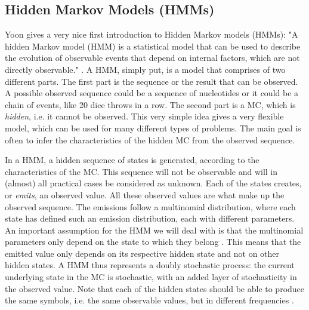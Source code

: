 \documentclass{article}\usepackage[]{graphicx}\usepackage[]{color}
\begin{document}
\subsection{Hidden Markov Models (HMMs)} \label{Section:HiddenMarkovModels}
Yoon gives a very nice first introduction to Hidden Markov models (HMMs): "A hidden Markov model (HMM) is a statistical model that can be used to describe the evolution of observable events that depend on internal factors, which are not directly observable." \cite{Yoon2009}. A HMM, simply put, is a model that comprises of two different parts. The first part is the sequence or the result that can be observed. A possible observed sequence could be a sequence of nucleotides or it could be a chain of events, like 20 dice throws in a row. The second part is a MC, which is \textit{hidden}, i.e. it cannot be observed. This very simple idea gives a very flexible model, which can be used for many different types of problems. The main goal is often to infer the characteristics of the hidden MC from the observed sequence. 

In a HMM, a hidden sequence of states is generated, according to the characteristics of the MC. This sequence will not be observable and will in (almost) all practical cases be considered as unknown. Each of the states creates, or \textit{emits}, an observed value. All these observed values are what make up the observed sequence. The emissions follow a multinomial distribution, where each state has defined such an emission distribution, each with different parameters. An important assumption for the HMM we will deal with is that the multinomial parameters only depend on the state to which they belong \cite{Choo2004}. This means that the emitted value only depends on its respective hidden state and not on other hidden states. A HMM thus represents a doubly stochastic process: the current underlying state in the MC is stochastic, with an added layer of stochasticity in the observed value. Note that each of the hidden states should be able to produce the same symbols, i.e. the same observable values, but in different frequencies \cite{Christianini2006}.
\end{document}

